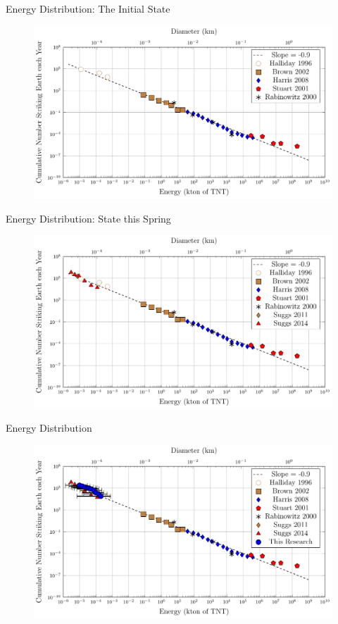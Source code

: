 \documentclass[pdf]{beamer}
\begin{document}
 \begin{frame}{Energy Distribution: The Initial State}
   \begin{figure}[ht!]
	 \centering
	 \includegraphics[width=\textwidth]{Images/Cumulative_Flux_All_1.pdf}
   \end{figure}
 \end{frame}
 
 \begin{frame}{Energy Distribution: State this Spring}
   \begin{figure}[ht!]
	 \centering
	 \includegraphics[width=\textwidth]{Images/Cumulative_Flux_All_2.pdf}
   \end{figure}
 \end{frame}
 
 \begin{frame}{Energy Distribution}
   \begin{figure}[ht!]
	 \centering
	 \includegraphics[width=\textwidth]{Images/Cumulative_Flux_All_3.pdf}
   \end{figure}
 \end{frame}
\end{document}
